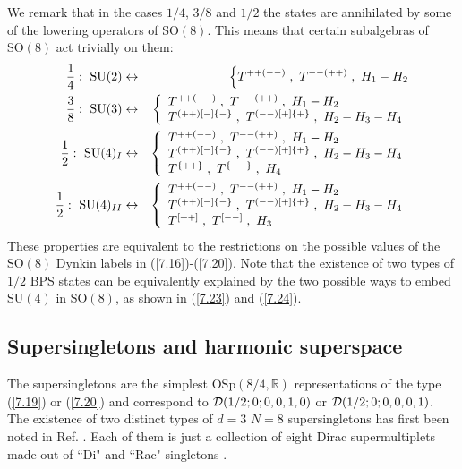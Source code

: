 \documentclass[a4paper,12pt]{article}
\begin{document}
We remark that in the cases $1/4$, $3/8$ and $1/2$ the states are
annihilated by some of the lowering operators of $\mbox{SO}(8)$. 
This means that certain subalgebras of $\mbox{SO}(8)$ act 
trivially on them: 
\begin{eqnarray}
  {1\over 4}:\ \mbox{SU}(2) &\leftrightarrow& 
\left\{ T^{++(--)}\;, \ T^{--(++)}\;, \ H_1-H_2 
 \right. \label{7.21}\\
{3\over 8}:\ \mbox{SU}(3) &\leftrightarrow& \left\{ 
\begin{array}{l}
   T^{++(--)}\;, \ T^{--(++)}\;, \ H_1-H_2 \\
   T^{(++)[-]\{-\}}\;, \ T^{(--)[+]\{+\}}\;, \ H_2-H_3-H_4
  \end{array}
 \right. \label{7.22}\\
{1\over 2} :\ \mbox{SU}(4)_I &\leftrightarrow& \left\{ 
\begin{array}{l}
   T^{++(--)}\;, \ T^{--(++)}\;, \ H_1-H_2 \\
   T^{(++)[-]\{-\}}\;, \ T^{(--)[+]\{+\}}\;, \ H_2-H_3-H_4 \\
   T^{\{++\}}\;, \ T^{\{--\}}\;, \ H_4
  \end{array}
 \right. \label{7.23}\\
{1\over 2} :\ \mbox{SU}(4)_{II} &\leftrightarrow&  \left\{ 
\begin{array}{l}
   T^{++(--)}\;, \ T^{--(++)}\;, \ H_1-H_2 \\
   T^{(++)[-]\{-\}}\;, \ T^{(--)[+]\{+\}}\;, \ H_2-H_3-H_4 \\
   T^{[++]}\;, \ T^{[--]}\;, \ H_3
  \end{array}
 \right. \label{7.24}
\end{eqnarray} 
These properties are equivalent to the restrictions on the 
possible values of the $\mbox{SO}(8)$ Dynkin labels in 
(\ref{7.16})-(\ref{7.20}). Note that the existence of two types of 
$1/2$ BPS states can be equivalently explained by the two possible 
ways to embed $\mbox{SU}(4)$ in $\mbox{SO}(8)$, as shown in 
(\ref{7.23}) and (\ref{7.24}). 

\subsection{Supersingletons and harmonic superspace}

The supersingletons are the simplest $\mbox{OSp}(8/4,\mathbb{R})$ 
representations of the type (\ref{7.19}) or (\ref{7.20}) and 
correspond to ${\cal D}(1/2; 0; 0,0,1,0)$ or ${\cal D}(1/2; 0; 
0,0,0,1)$. The existence of two distinct types of $d=3$ $N=8$ 
supersingletons has first been noted in Ref. \cite{GNST}. Each of 
them is just a collection of eight Dirac supermultiplets \cite{Fr} 
made out of ``Di" and ``Rac" singletons \cite{ff2}. 
\end{document}
